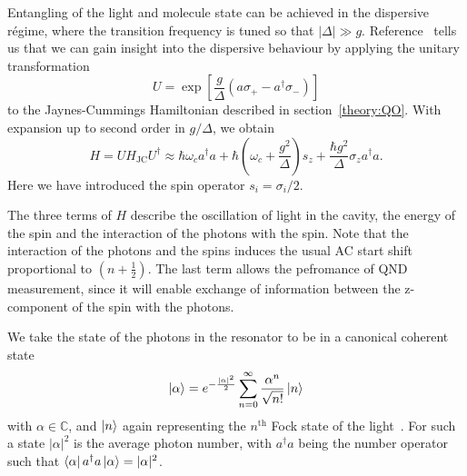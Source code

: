 Entangling of the light and molecule state can be achieved in the dispersive
r\'egime, where the transition frequency is tuned so that $|\Delta|\gg g$.
Reference~\cite{PhysRevA.69.062320} tells us that we can gain insight into the
dispersive behaviour by applying the unitary transformation
%
\begin{equation} U = \exp \left[\frac{g}{\Delta}(a\sigma_+ -
a^\dagger\sigma_-)\right] \end{equation}
%
to the Jaynes-Cummings Hamiltonian described in section~\ref{theory:QO}. With
expansion up to second order in $g/\Delta$, we obtain
%
\begin{equation} H= UH_\text{JC}U^\dagger \approx \hbar \omega_c
  a^\dagger a + \hbar\left(\omega_c +
  \frac{g^2}{\Delta}\right)s_z + \frac{\hbar
  g^2}{\Delta}\sigma_z a^\dagger a.
\end{equation}
%
Here we have introduced the spin operator $s_i = \sigma_i/2$.

The three terms of $H$ describe the oscillation of light in the cavity, the energy
of the spin and the interaction of the photons with the spin. Note that the
interaction of the photons and the spins induces the usual AC start shift
proportional to $(n+\frac{1}{2})$. The last term allows the pefromance of 
QND measurement, since it will enable exchange of information
between the z-component of the spin with the photons.

We take the state of the photons in the resonator to be in a canonical coherent
state~\cite{Gazeau2009}
%
\begin{equation}
  \ket{\alpha} = e^{-\frac{|\alpha|^2}{2}}\sum_{n=0}^\infty \frac{\alpha^n}{\sqrt{n!}} \ket{n}
\end{equation}
%
with $\alpha\in\mathbb{C}$, and $\ket{n}$ again representing the $n^\text{th}$
Fock state of the light~\cite{agarwal2012}. For such a state $|\alpha|^2$ is
the average photon number, with $a^\dagger a$ being the number operator such
that $\bra{\alpha}a^\dagger a \ket{\alpha} = |\alpha|^2$.

